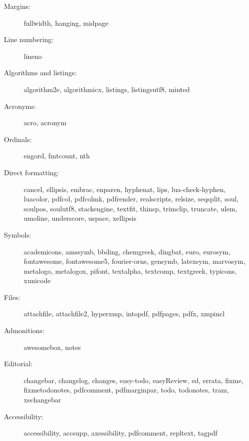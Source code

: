 \documentclass{article}
\def\pkg#1{#1}%
\renewcommand*{\pkg}[1]{#1}
\begin{document}
\begin{multicols}{2}
\begin{description}
\item[Margins:] \pkg{fullwidth}, \pkg{hanging}, \pkg{midpage}

\item[Line numbering:] \pkg{lineno}

\item[Algorithms and listings:] \pkg{algorithm2e}, \pkg{algorithmicx},
    \pkg{listings}, \pkg{listingsutf8}, \pkg{minted}

\item[Acronyms:] \pkg{acro}, \pkg{acronym}

\item[Ordinals:] \pkg{engord}, \pkg{fmtcount}, \pkg{nth}

\item[Direct formatting:]
    \pkg{cancel}, \pkg{ellipsis}, \pkg{embrac}, \pkg{enparen},
    \pkg{hyphenat}, \pkg{lips},
    \pkg{lua-check-hyphen}, \pkg{luacolor},
    \pkg{pdfcol}, \pkg{pdfcolmk},
    \pkg{pdfrender}, \pkg{realscripts}, \pkg{relsize},
    \pkg{seqsplit}, \pkg{soul}, \pkg{soulpos},
    \pkg{soulutf8}, \pkg{stackengine},
    \pkg{textfit}, \pkg{thinsp}, \pkg{trimclip}, \pkg{truncate},
    \pkg{ulem}, \pkg{umoline}, \pkg{underscore}, \pkg{uspace},
    \pkg{xellipsis}

\item[Symbols:] \pkg{academicons}, \pkg{amssymb}, \pkg{bbding},
    \pkg{chemgreek}, \pkg{dingbat}, \pkg{euro}, \pkg{eurosym},
    \pkg{fontawesome}, \pkg{fontawesome5}, \pkg{fourier-orns},
    \pkg{gensymb}, \pkg{latexsym},
    \pkg{marvosym},  \pkg{metalogo}, \pkg{metalogox},
    \pkg{pifont},  \pkg{textalpha},  \pkg{textcomp}, \pkg{textgreek},
    \pkg{typicons}, \pkg{xunicode}

\item[Files:]
    \pkg{attachfile}, \pkg{attachfile2}, \pkg{hyperxmp},
    \pkg{intopdf}, \pkg{pdfpages}, \pkg{pdfx}, \pkg{xmpincl}

\item[Admonitions:] \pkg{awesomebox}, \pkg{notes}

\item[Editorial:] \pkg{changebar}, \pkg{changelog}, \pkg{changes},
    \pkg{easy-todo}, \pkg{easyReview}, \pkg{ed}, \pkg{errata}, \pkg{fixme},
    \pkg{fixmetodonotes},
    \pkg{pdfcomment}, \pkg{pdfmarginpar},
    \pkg{todo}, \pkg{todonotes}, \pkg{tram}, \pkg{xechangebar}

\item[Accessibility:] \pkg{accessibility}, \pkg{accsupp},
    \pkg{axessibility},
    \pkg{pdfcomment}, \pkg{repltext}, \pkg{tagpdf}


\end{description}
\end{multicols}
\end{document}
